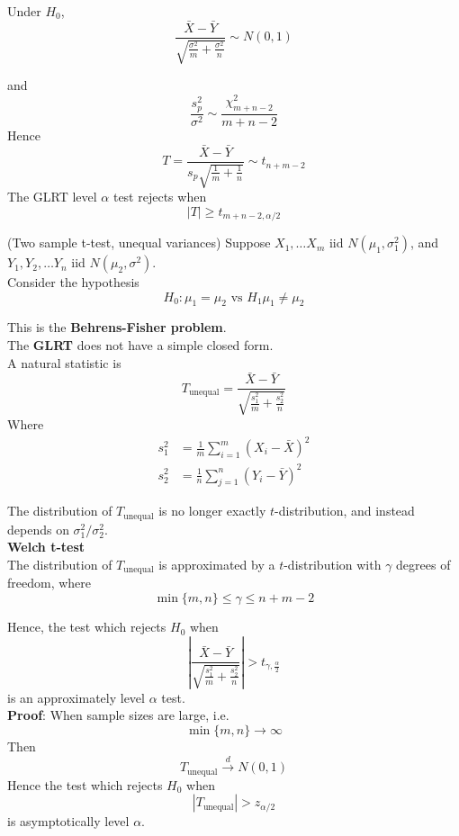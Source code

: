 \begin{example}
    Under $H_0$, 
    \[
        \frac{\bar{X} - \bar{Y}  }{ \sqrt{ \frac{\sigma^2}{m} + \frac{\sigma^2}{n}}} \sim N(0, 1)
    \]

    and 
    \[
        \frac{s_p^2}{\sigma^2} \sim \frac{\chi_{m + n - 2}^2}{m + n - 2}
    \]
    Hence 
    \[
        T = \frac{\bar{X} - \bar{Y} }{s_p \sqrt{ \frac{1}{m} + \frac{1}{n}}} \sim t_{n + m - 2}
    \]
    The GLRT level $\alpha$ test rejects when 
    \[
        \left| T \right|  \geq t_{m+ n - 2, \alpha / 2}
    \]
    
\end{example}

\begin{example} (Two sample t-test, unequal variances)
    Suppose $X_1, \hdots X_m$ iid $N(\mu_1, \sigma_1^2)$, and $Y_1, Y_2, \hdots Y_n$ iid $N(\mu_2, \sigma^2)$. \\

    Consider the hypothesis 
    \[
        H_0: \mu_1 = \mu_2 \text{ vs } H_1 \mu_1 \neq \mu_2
    \]

    This is the \textbf{Behrens-Fisher problem}. \\

    The \textbf{GLRT} does not have a simple closed form. \\

    A natural statistic is 
    \[
        T_{\text{unequal}} = \frac{
            \bar{X}  - \bar{Y} 
        }{
            \sqrt{
                \frac{s_1^2}{m} + \frac{s_2^2}{n}
            }
        }
    \]
    Where 
    \begin{align*}
        s_1^2 &= \frac{1}{m} \sum\limits_{i = 1}^{m}  \left( X_i - \bar{X}  \right)^2 \\
        s_2^2 &= \frac{1}{n} \sum\limits_{j = 1}^{n}  \left( Y_i - \bar{Y}  \right)^2
    \end{align*}

    The distribution of $T_{ \text{unequal}}$ is no longer exactly $t$-distribution, and instead depends on $ \sigma^2_1 / \sigma_2^2$. \\

    \textbf{Welch t-test} \\

    The distribution of $T_{\text{unequal}}$ is approximated by a $t$-distribution with $\gamma$ degrees of freedom, where 
    \[
        \min \{ m, n \}  \leq \gamma \leq n + m -2
    \]

    Hence, the test which rejects $H_0$ when 
    \[
        \left| \frac{
            \bar{X}  - \bar{Y} 
        }{
            \sqrt{
                \frac{s_1^2}{m} + \frac{s_2^2}{n}
            }
        } \right| > t_{\gamma, \frac{\alpha}{2}}
    \]
    is an approximately level $\alpha$ test. \\

    \textbf{Proof}:
    When sample sizes are large, i.e. 
    \[
        \min \{ m, n \}  \to \infty
    \]
    Then
    \[
        T_{\text{unequal}} \overset{d}{\longrightarrow}  N(0, 1)
    \]
    Hence the test which rejects $H_0$ when 
    \[
        \left| T_{\text{unequal}} \right|  > z_{\alpha / 2}
    \]
    is asymptotically level $\alpha$.
\end{example}

\newpage

